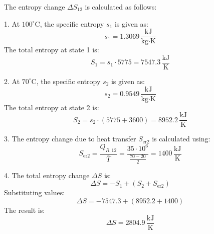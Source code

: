 The entropy change \( \Delta S_{12} \) is calculated as follows:  

1. At \( 100^\circ\text{C} \), the specific entropy \( s_1 \) is given as:  
\[
s_1 = 1.3069 \, \frac{\text{kJ}}{\text{kg·K}}
\]  
The total entropy at state 1 is:  
\[
S_1 = s_1 \cdot 5775 = 7547.3 \, \frac{\text{kJ}}{\text{K}}
\]  

2. At \( 70^\circ\text{C} \), the specific entropy \( s_2 \) is given as:  
\[
s_2 = 0.9549 \, \frac{\text{kJ}}{\text{kg·K}}
\]  
The total entropy at state 2 is:  
\[
S_2 = s_2 \cdot (5775 + 3600) = 8952.2 \, \frac{\text{kJ}}{\text{K}}
\]  

3. The entropy change due to heat transfer \( S_{\text{er2}} \) is calculated using:  
\[
S_{\text{er2}} = \frac{Q_{R,12}}{\bar{T}} = \frac{35 \cdot 10^6}{\frac{70 - 20}{2}} = 1400 \, \frac{\text{kJ}}{\text{K}}
\]  

4. The total entropy change \( \Delta S \) is:  
\[
\Delta S = -S_1 + (S_2 + S_{\text{er2}})
\]  
Substituting values:  
\[
\Delta S = -7547.3 + (8952.2 + 1400)
\]  
The result is:  
\[
\Delta S = 2804.9 \, \frac{\text{kJ}}{\text{K}}
\]